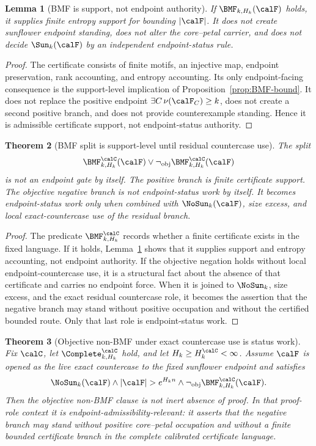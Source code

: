 \documentclass[11pt]{article}
\newtheorem{theorem}{Theorem}[section]
\newtheorem{lemma}[theorem]{Lemma}
\begin{document}
\begin{lemma}[BMF is support, not endpoint authority]\label{lem:BMF-support}
If \(\BMF_{k,H_k}(\calF)\) holds, it supplies finite entropy support for bounding \(|\calF|\).  It does not create sunflower endpoint standing, does not alter the core--petal carrier, and does not decide \(\Sun_k(\calF)\) by an independent endpoint-status rule.
\end{lemma}

\begin{proof}
The certificate consists of finite motifs, an injective map, endpoint preservation, rank accounting, and entropy accounting.  Its only endpoint-facing consequence is the support-level implication of Proposition~\ref{prop:BMF-bound}.  It does not replace the positive endpoint \(\exists C\,\nu(\calF_C)\ge k\), does not create a second positive branch, and does not provide counterexample standing.  Hence it is admissible certificate support, not endpoint-status authority.
\end{proof}

\begin{theorem}[BMF split is support-level until residual countercase use]\label{thm:BMF-split-support}
The split
\[
  \BMF^{\calC}_{k,H_k}(\calF)\vee \neg_{\mathrm{obj}}\BMF^{\calC}_{k,H_k}(\calF)
\]
is not an endpoint gate by itself.  The positive branch is finite certificate support.  The objective negative branch is not endpoint-status work by itself.  It becomes endpoint-status work only when combined with \(\NoSun_k(\calF)\), size excess, and local exact-countercase use of the residual branch.
\end{theorem}

\begin{proof}
The predicate \(\BMF^{\calC}_{k,H_k}\) records whether a finite certificate exists in the fixed language.  If it holds, Lemma~\ref{lem:BMF-support} shows that it supplies support and entropy accounting, not endpoint authority.  If the objective negation holds without local endpoint-countercase use, it is a structural fact about the absence of that certificate and carries no endpoint force.  When it is joined to \(\NoSun_k\), size excess, and the exact residual countercase role, it becomes the assertion that the negative branch may stand without positive occupation and without the certified bounded route.  Only that last role is endpoint-status work.
\end{proof}

\begin{theorem}[Objective non-BMF under exact countercase use is status work]\label{thm:nonBMF-status}
Fix \(\calC\), let \(\Complete^{\calC}_{k,H_k}\) hold, and let \(H_k\ge H_k^{\calC}<\infty\).  Assume \(\calF\) is opened as the live exact countercase to the fixed sunflower endpoint and satisfies
\[
  \NoSun_k(\calF)\wedge |\calF|>e^{H_k n}\wedge \neg_{\mathrm{obj}}\BMF^{\calC}_{k,H_k}(\calF).
\]
Then the objective non-BMF clause is not inert absence of proof.  In that proof-role context it is endpoint-admissibility-relevant: it asserts that the negative branch may stand without positive core--petal occupation and without a finite bounded certificate branch in the complete calibrated certificate language.
\end{theorem}
\end{document}
